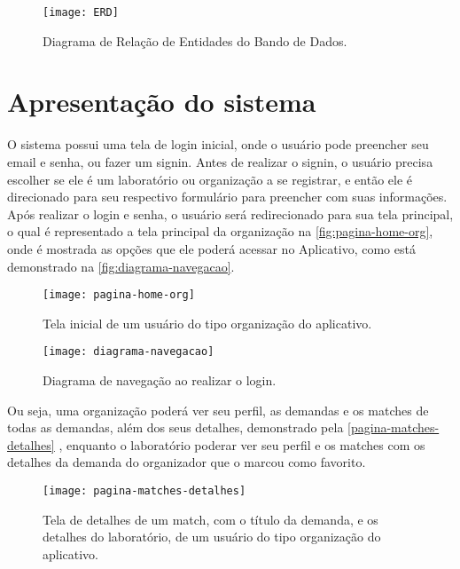 \begin{figure}[htpb]
    \captionsetup{width=0.43\textwidth}
    \caption{Diagrama de Relação de Entidades do Bando de Dados.}
    \label{fig:ERD}
    \texttt{[image: ERD]}
    \fonte{}
\end{figure}


\section{Apresentação do sistema}\label{sec:apresentacaoSistema}

O sistema possui uma tela de login inicial, onde o usuário pode preencher seu email e senha, ou fazer um signin. Antes de realizar o signin, o usuário precisa escolher se ele é um laboratório ou organização a se registrar, e então ele é direcionado para seu respectivo formulário para preencher com suas informações.
Após realizar o login e senha, o usuário será redirecionado para sua tela principal, o qual é representado a tela principal da organização na \autoref{fig:pagina-home-org}, onde é mostrada as opções que ele poderá acessar no Aplicativo, como está demonstrado na \autoref{fig:diagrama-navegacao}.

\begin{figure}[htpb]
    \captionsetup{width=0.43\textwidth}
    \caption{Tela inicial de um usuário do tipo organização do aplicativo.}
    \label{fig:pagina-home-org}
    \texttt{[image: pagina-home-org]}
    \fonte{}
\end{figure}

\begin{figure}[htpb]
    \captionsetup{width=0.43\textwidth}
    \caption{Diagrama de navegação ao realizar o login.}
    \label{fig:diagrama-navegacao}
    \texttt{[image: diagrama-navegacao]}
    \fonte{}
\end{figure}

Ou seja, uma organização poderá ver seu perfil, as demandas e os matches de todas as demandas, além dos seus detalhes, demonstrado pela \autoref{pagina-matches-detalhes} , enquanto o laboratório poderar ver seu perfil e os matches com os detalhes da demanda do organizador que o marcou como favorito.

\begin{figure}[htpb]
    \captionsetup{width=0.43\textwidth}
    \caption{Tela de detalhes de um match, com o título da demanda, e os detalhes do laboratório, de um usuário do tipo organização do aplicativo.}
    \label{fig:pagina-matches-detalhes}
    \texttt{[image: pagina-matches-detalhes]}
    \fonte{}
\end{figure}


